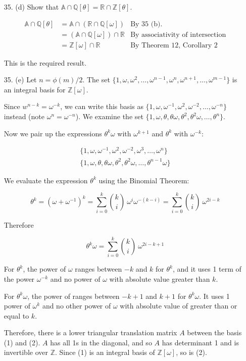 \documentclass{article}
\newcommand{\w}[0]{\omega}
\newcommand{\Q}[0]{\mathbb{Q}}
\newcommand{\R}[0]{\mathbb{R}}
\newcommand{\Z}[0]{\mathbb{Z}}
\begin{document}
\begin{enumerate}
\item[35. (d)]  Show that $\mathbb{A} \cap \Q[\theta] = \R \cap \Z[\theta]$.

\begin{align*}
    \mathbb{A} \cap \Q[\theta]
        &= \mathbb{A} \cap (\R \cap \Q[\w]) & \text{By 35 (b).}\\
        &= (\mathbb{A} \cap \Q[\w]) \cap \R & \text{By associativity of intersection}\\
        &= \Z[\w] \cap \R & \text{By Theorem 12, Corollary 2}
\end{align*}

This is the required result.

\item[35. (e)] Let $n = \phi(m) / 2$.  The set $\{ 1, \w, \w^2, \ldots, \w^{n-1}, \w^{n}, \w^{n+1}, \ldots, \w^{m-1} \}$ is an integral basis for $\Z[\w]$.

Since $w^{n-k} = \w^{-k}$, we can write this basis as $\{1, \w, \w^{-1}, \w^2, \w^{-2}, \ldots, \w^{-n}\}$ instead (note $\w^{n} = \w^{-n}$).  We examine the set $\{1, \w, \theta, \theta\w, \theta^2, \theta^2\w, \ldots, \theta^{n} \}$.

Now we pair up the expressions $\theta^{k}\w$ with $\w^{k+1}$ and $\theta^{k}$ with $\w^{-k}$:

\begin{gather}
\{1, \w, \w^{-1}, \w^2,     \w^{-2},  \w^{3},     \ldots, \w^{n} \} \\
\{1, \w, \theta,  \theta\w, \theta^2, \theta^2\w, \ldots, \theta^{n-1}\w \}
\end{gather}

We evaluate the expression $\theta^{k}$ using the Binomial Theorem:

\[ \theta^{k} = (\w + \w^{-1})^k = \sum_{i = 0}^{k} \binom{k}{i}\ \w^{i} \w^{-(k-i)} = \sum_{i = 0}^{k} \binom{k}{i}\ \w^{2i - k} \]

Therefore

\[ \theta^{k}\w = \sum_{i = 0}^{k} \binom{k}{i}\ \w^{2i - k + 1} \]

For $\theta^{k}$, the power of $\w$ ranges between $-k$ and $k$ for $\theta^{k}$, and it uses 1 term of the power $\w^{-k}$ and no power of $\w$ with absolute value greater than $k$.

For $\theta^{k}\w$, the power of ranges between $-k + 1$ and $k + 1$ for $\theta^{k}\w$.  It uses 1 power of $\w^{k}$ and no other power of $\w$ with absolute value of greater than or equal to $k$.

Therefore, there is a lower triangular translation matrix $A$ between the basis (1) and (2).  $A$ has all 1s in the diagonal, and so $A$ has determinant 1 and is invertible over $\Z$.  Since (1) is an integral basis of $\Z[\w]$, so is (2).


\end{enumerate}
\end{document}
